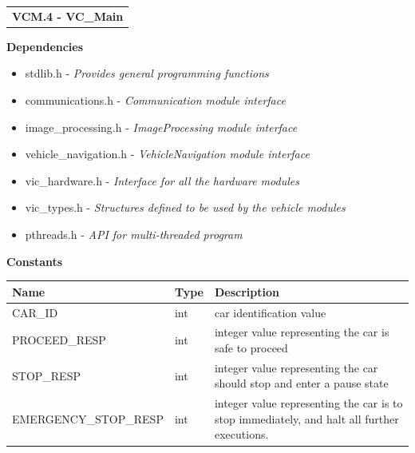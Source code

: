 \documentclass [10pt]{article}
\begin{document}
\begin{longtable}{p{}}
\rowcolor{subsectionC}\textbf{VCM.4 - VC\_Main} \\
\end{longtable}





\textbf{Dependencies} 
\begin{itemize} 
\itemsep 0em 
\item stdlib.h - \textit{Provides general programming functions}
\item communications.h - \textit{Communication module interface}
\item image\_processing.h - \textit{ImageProcessing module interface}
\item vehicle\_navigation.h - \textit{VehicleNavigation module interface}
\item vic\_hardware.h - \textit{Interface for all the hardware modules  }
\item vic\_types.h -  \textit{Structures defined to be used by the vehicle modules}
\item pthreads.h -  \textit{API for multi-threaded program}
\end{itemize}

\textbf{Constants}\\ 
\begin{longtable}{| p{ }  p{ } p{}|} \hline

 \textbf{Name} & \textbf{Type} & \textbf{Description} \\ \hline
\rowcolor{tableCell} CAR\_ID & int & car identification value\\ \hline
PROCEED\_RESP & int & integer value representing the car is safe to proceed \\ \hline
\rowcolor{tableCell} STOP\_RESP & int & integer value representing the car should stop and enter a pause state\\ \hline
EMERGENCY\_STOP\_RESP & int & integer value representing the car is to stop immediately, and halt all further executions. \\ \hline




\end{longtable}
\end{document}
